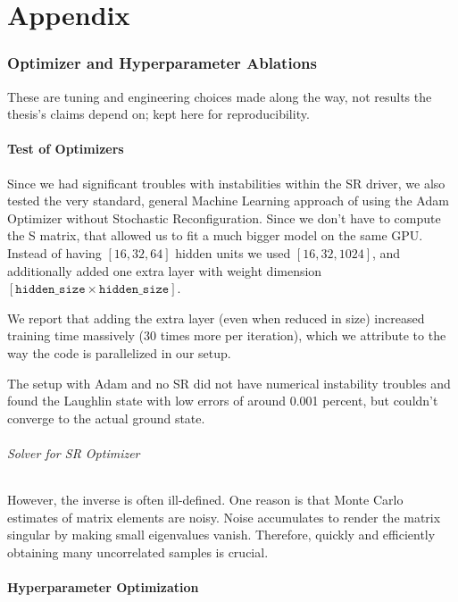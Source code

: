 \documentclass[a4paper,11pt,twoside]{article}
\begin{document}
\newpage
\part{Appendix}
\appendix

\section{Optimizer and Hyperparameter Ablations}
\label{app:ablations}

These are tuning and engineering choices made along the way, not results the thesis's claims depend on; kept here for reproducibility.

\subsection{Test of Optimizers}

Since we had significant troubles with instabilities within the SR driver, we also tested the very standard, general Machine Learning approach of using the Adam Optimizer without Stochastic Reconfiguration. Since we don't have to compute the S matrix, that allowed us to fit a much bigger model on the same GPU.
Instead of having $[16,32,64]$ hidden units we used $[16,32,1024]$, and additionally added one extra layer with weight dimension $[\texttt{hidden\_size} \times \texttt{hidden\_size}]$.

We report that adding the extra layer (even when reduced in size) increased training time massively (30 times more per iteration), which we attribute to the way the code is parallelized in our setup.

The setup with Adam and no SR did not have numerical instability troubles and found the Laughlin state with low errors of around 0.001 percent, but couldn't converge to the actual ground state.

\paragraph{Solver for SR Optimizer}

However, the inverse is often ill-defined. One reason is that Monte Carlo estimates of matrix elements are noisy. Noise accumulates to render the matrix singular by making small eigenvalues vanish. Therefore, quickly and efficiently obtaining many uncorrelated samples is crucial. \cite{medvidovic_variational_2023}

\label{sec:solver}
\subsection{Hyperparameter Optimization}
\end{document}
